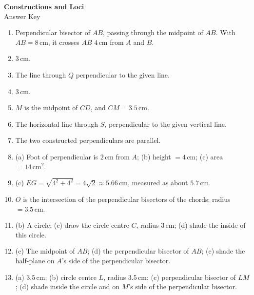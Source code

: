 \documentclass[12pt,a4paper]{article}
\begin{document}
\begin{center}
  {\LARGE\bfseries Constructions and Loci}\\[2pt]
  {\Large Answer Key}
\end{center}

\begin{enumerate}[label=\textbf{Q\arabic*.}, leftmargin=*, itemsep=4pt, topsep=4pt]

\item Perpendicular bisector of \(AB\), passing through the midpoint of \(AB\). With \(AB=8\,\text{cm}\), it crosses \(AB\) \(4\,\text{cm}\) from \(A\) and \(B\).

\item \(3\,\text{cm}\).

\item The line through \(Q\) perpendicular to the given line.

\item \(3\,\text{cm}\).

\item \(M\) is the midpoint of \(CD\), and \(CM=3.5\,\text{cm}\).

\item The horizontal line through \(S\), perpendicular to the given vertical line.

\item The two constructed perpendiculars are parallel.

\item (a) Foot of perpendicular is \(2\,\text{cm}\) from \(A\); (b) height \(=4\,\text{cm}\); (c) area \(=14\,\text{cm}^2\).

\item (c) \(EG=\sqrt{4^2+4^2}=4\sqrt2\approx5.66\,\text{cm}\), measured as about \(5.7\,\text{cm}\).

\item \(O\) is the intersection of the perpendicular bisectors of the chords; radius \(=3.5\,\text{cm}\).

\item (b) A circle; (c) draw the circle centre \(C\), radius \(3\,\text{cm}\); (d) shade the inside of this circle.

\item (c) The midpoint of \(AB\); (d) the perpendicular bisector of \(AB\); (e) shade the half-plane on \(A\)'s side of the perpendicular bisector.

\item (a) \(3.5\,\text{cm}\); (b) circle centre \(L\), radius \(3.5\,\text{cm}\); (c) perpendicular bisector of \(LM\); (d) shade inside the circle and on \(M\)'s side of the perpendicular bisector.


\end{enumerate}
\end{document}
